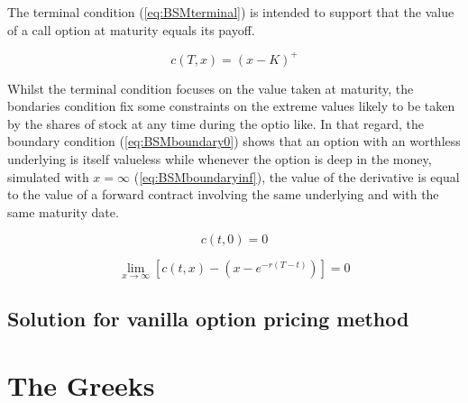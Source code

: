 \documentclass[12pt]{report}
\newcommand{\call}[2]{c\left( #1, #2\right)}
\begin{document}
The terminal condition (\ref{eq:BSMterminal}) is intended to support that the value of a call option at maturity equals its payoff. 

\begin{center}
  \begin{equation}
    \call{T}{x} = \left(x - K\right) ^+
    \label{eq:BSMterminal}
  \end{equation}
\end{center}

Whilst the terminal condition focuses on the value taken at maturity, the bondaries condition fix some constraints on the extreme values likely to be taken by the shares of stock at any time during the optio like. 
In that regard, the boundary condition (\ref{eq:BSMboundary0}) shows that an option with an worthless underlying is itself valueless while whenever the option is deep in the money, simulated with $x = \infty$ (\ref{eq:BSMboundaryinf}), the value of the derivative is equal to the value of a forward contract involving the same underlying and with the same maturity date.

\begin{center}
  \begin{equation}
    \call{t}{0} = 0
    \label{eq:BSMboundary0}
  \end{equation}
\end{center}

\begin{center}
  \begin{equation}
    \lim_{x\to\infty} \left[ \call{t}{x} - \left(x - e^{-r \left(T - t \right)} \right) \right] = 0
    \label{eq:BSMboundaryinf}
  \end{equation}
\end{center}

\section{Solution for vanilla option pricing method}
\label{sec:Solution for vanilla option pricing method}
%
%
\chapter{The Greeks}
\label{cha:The Greeks}
\end{document}
